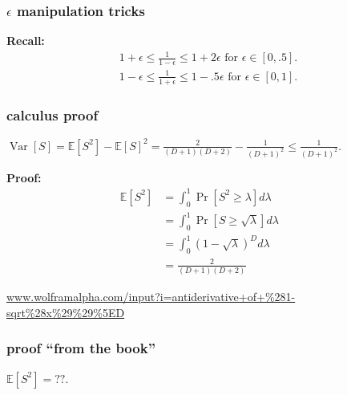 \documentclass[handout,compress]{beamer}
\newcommand{\E}{\mathbb{E}}
\DeclareMathOperator{\Var}{Var}
\begin{document}
\begin{frame}
\frametitle{$\epsilon$ manipulation tricks}
\textbf{Recall:}
\begin{align*}
	1+\epsilon \leq \frac{1}{1-\epsilon} \leq 1+ 2\epsilon \text{ for } \epsilon \in [0,.5].
\end{align*}
\begin{align*}
	1-\epsilon \leq \frac{1}{1+\epsilon} \leq 1 - .5\epsilon \text{ for } \epsilon \in [0,1].
\end{align*}
\end{frame}

\begin{frame}
	\frametitle{calculus proof}	
	\begin{lemma}
	$\Var[S] = \E [S^2] - \E[S]^2= \frac{2}{(D+1)(D+2)} - \frac{1}{(D+1)^2} \leq \frac{1}{(D+1)^2}$.
	\end{lemma}
	\textbf{Proof:} 
	\begin{align*}
	\E[S^2] &= \int_0^1 \Pr[S^2 \geq \lambda] d\lambda & &\text{} \\
	&= \int_0^1 \Pr[S \geq \sqrt{\lambda}] d\lambda & &\text{} \\
	&= \int_0^1 (1-\sqrt{\lambda})^D d\lambda & &\text{} \\
	& = \frac{2}{(D+1)(D+2)}& &\text{}
	\end{align*}
	
	\small
	\url{www.wolframalpha.com/input?i=antiderivative+of+\%281-sqrt\%28x\%29\%29\%5ED}
\end{frame}

\begin{frame}
	\frametitle{proof ``from the book''}
	$\E[S^2] = ??$.
	\begin{center}
	\end{center}
\end{frame}
\end{document}
